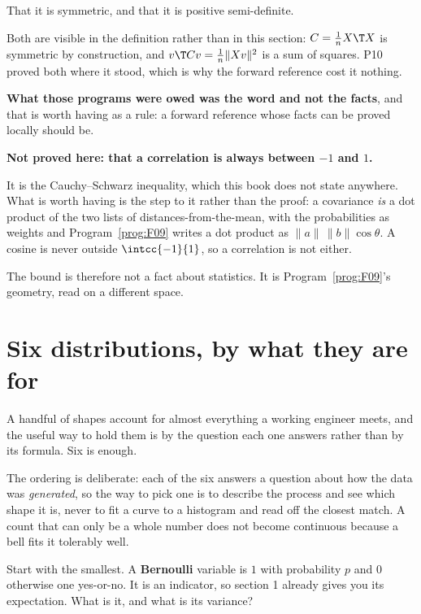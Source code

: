 \begin{fr}
\begin{ansblock}
That it is symmetric, and that it is positive semi-definite.
\end{ansblock}

Both are visible in the definition rather than in this section:
$C = \frac{1}{n}X\T X$ is symmetric by construction, and
$v\T C v = \frac{1}{n}\lVert Xv \rVert^{2}$ is a sum of squares. P10 proved
both where it stood, which is why the forward reference cost it nothing.

\textbf{What those programs were owed was the word and not the facts}, and
that is worth having as a rule: a forward reference whose facts can be proved
locally should be.
\end{fr}

\begin{fr}
\begin{rigourbox}
\textbf{Not proved here: that a correlation is always between $-1$ and $1$.}

It is the Cauchy--Schwarz inequality, which this book does not state
anywhere. What is worth having is the step to it rather than the proof: a
covariance \emph{is} a dot product \dash{} of the two lists of
distances-from-the-mean, with the probabilities as weights \dash{} and
Program~\ref{prog:F09} writes a dot product as
$\lVert a \rVert\, \lVert b \rVert \cos\theta$. A cosine is never outside
$\intcc{-1}{1}$, so a correlation is not either.

The bound is therefore not a fact about statistics. It is
Program~\ref{prog:F09}'s geometry, read on a different space.
\end{rigourbox}

\end{fr}

\section{Six distributions, by what they are for}
\label{sec:P24-families}

\begin{fr}
A handful of shapes account for almost everything a working engineer meets,
and the useful way to hold them is by the question each one answers rather
than by its formula. Six is enough.

The ordering is deliberate: each of the six answers a question about how the
data was \emph{generated}, so the way to pick one is to describe the process
and see which shape it is, never to fit a curve to a histogram and read off
the closest match. A count that can only be a whole number does not become
continuous because a bell fits it tolerably well.

Start with the smallest. A \textbf{Bernoulli} variable is $1$ with probability
$p$ and $0$ otherwise \dash{} one yes-or-no. It is an indicator, so section 1
already gives you its expectation. What is it, and what is its variance?
\dotline
\nextframe
\end{fr}

